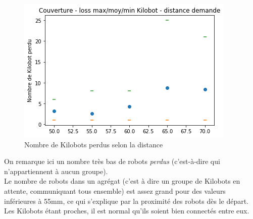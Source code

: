 \documentclass[a4paper]{article}
\begin{document}
\begin{figure}[h!]
	\centering
	\begin{minipage}[c]{.46\linewidth}
		\centering
		\includegraphics[width=1.1\linewidth]{../../script_results/Couverture_loss_kilobot_groupe.png}
		\caption{Nombre de Kilobots perdus selon la distance}
	\end{minipage}
\end{figure}
On remarque ici un nombre très bas de robots \textit{perdus} (c'est-à-dire qui n'appartiennent à aucun groupe). \\Le nombre de robots dans un agrégat (c'est à dire un groupe de Kilobots en attente, communiquant tous ensemble) est assez grand pour des valeurs inférieures à 55mm, ce qui s'explique par la proximité des robots dès le départ. Les Kilobots étant proches, il est normal qu'ils soient bien connectés entre eux.
\end{document}
